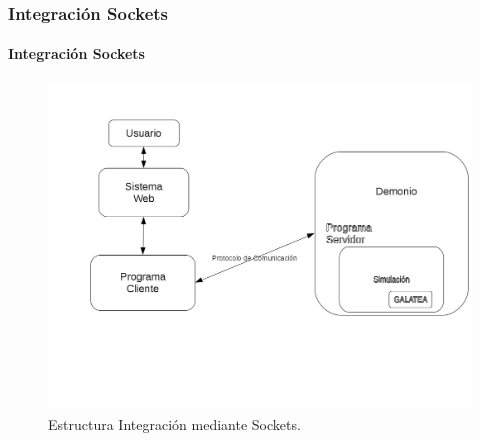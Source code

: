 \documentclass[spanish,xcolor=dvipsnames]{beamer}
\begin{document}
    \begin{frame}
    	\frametitle{Integración Sockets}
    	\framesubtitle{Integración Sockets}
    	
    	\begin{figure}[H]
    		\centering
    		\includegraphics[scale=0.3]{img/estructuraSockets.png}
    		\caption{Estructura Integración mediante Sockets.}
    		\label{estructuraSokets}
    	\end{figure}
    \end{frame}
\end{document}
